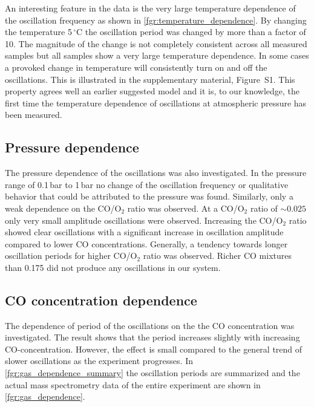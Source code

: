 \documentclass[journal=jacsat,manuscript=article]{achemso}
\begin{document}
An interesting feature in the data is the very large temperature dependence of the
oscillation frequency as shown in \ref{fgr:temperature_dependence}. By
changing the temperature 5\,$^\circ$C the oscillation period was changed by more
than a factor of 10. The magnitude of the change is not completely consistent
across all measured samples but all samples show a very large temperature
dependence. In some cases a provoked change in temperature will
consistently turn on and off the oscillations. This is illustrated in the supplementary
material, Figure~S1.
This property agrees well an earlier suggested model \cite{Hendriksen2010} and
it is, to our knowledge, the first time the temperature dependence of
oscillations at atmospheric pressure has been measured.

\subsection{Pressure dependence}
The pressure dependence of the oscillations was also investigated. In the
pressure range of 0.1\,bar to 1\,bar no change of the oscillation frequency or
qualitative behavior that could be attributed to the pressure was found.
Similarly, only a weak dependence on the CO/O$_2$ ratio was observed. At a
CO/O$_2$ ratio of $\sim0.025$ only very small amplitude oscillations were
observed. Increasing the CO/O$_2$ ratio showed clear oscillations with a significant
increase in oscillation amplitude compared to lower CO concentrations.
Generally, a tendency towards longer oscillation periods for higher CO/O$_2$
ratio was observed. Richer CO mixtures than 0.175 did not produce any
oscillations in our system.


\subsection{CO concentration dependence}
The dependence of period of the oscillations on the the CO concentration was
investigated. The result shows that the period increases slightly with
increasing CO-concentration. However, the effect is small compared to the
general trend of slower oscillations as the experiment progresses. In
\ref{fgr:gas_dependence_summary} the oscillation periods are summarized and the
actual mass spectrometry data of the entire experiment are shown in \ref{fgr:gas_dependence}.
\end{document}
